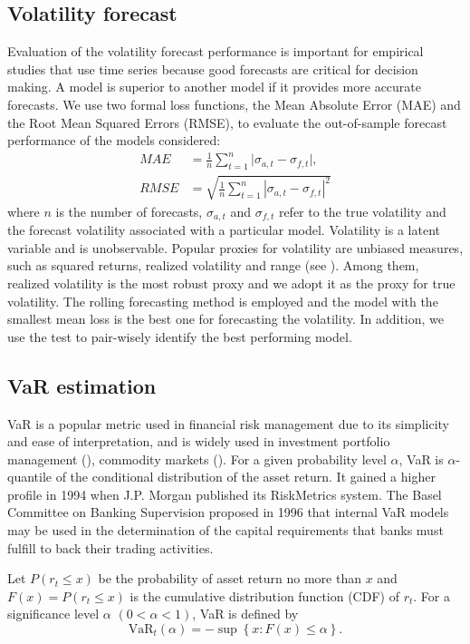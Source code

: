 \documentclass[preprint,12pt,authoryear]{elsarticle}
\begin{document}
\subsection{Volatility forecast}
Evaluation of the volatility forecast performance is important for empirical studies that use time series because good forecasts are critical for decision making. A model is superior to another model if it provides more accurate forecasts. We use two formal loss functions, the Mean Absolute Error (MAE) and the Root Mean Squared Errors (RMSE), to evaluate the out-of-sample forecast performance of the models considered:
\begin{align}
    MAE&=\frac{1}{n}\sum_{t=1}^n\vert\sigma_{a,t}-\sigma_{f,t}\vert,\\
    RMSE&=\sqrt{\frac{1}{n}\sum_{t=1}^n\left\vert\sigma_{a,t}-\sigma_{f,t}\right\vert^2}
\end{align}
where $n$ is the number of forecasts, $\sigma_{a,t}$ and $\sigma_{f,t}$ refer to the true volatility and the forecast volatility associated with a particular model. Volatility is a latent variable and is unobservable. Popular proxies for volatility are unbiased measures, such as squared returns, realized volatility and range (see \cite{Patton2011}). Among them, realized volatility is the most robust proxy and we adopt it as the proxy for true volatility.
The rolling forecasting method is employed and the model with the smallest mean loss is the best one for forecasting the volatility.
In addition, we use the \cite{Diebold1995} test to pair-wisely identify the best performing model.

\subsection{VaR estimation} \label{xiaodou1}
VaR is a popular metric used in financial risk management due to its simplicity and ease of interpretation, and is widely used in investment portfolio management (\cite{Chen2019}), commodity markets (\cite{Chkili2014}).
For a given probability level $\alpha$, VaR is $\alpha$-quantile of the conditional distribution of the asset return.
It gained a higher profile in 1994 when J.P. Morgan published its RiskMetrics system. The Basel Committee on Banking Supervision proposed in 1996 that internal VaR models may be used in the determination of the capital requirements that banks must fulfill to back their trading activities.

Let $P(r_{t}\le x)$ be the probability of asset return no more than $x$ and $F(x)=P(r_{t}\le x)$ is the cumulative distribution function (CDF) of $r_{t}$. For a significance level $\alpha$ $(0<\alpha<1)$, VaR is defined by
\begin{equation}
	\mathrm{VaR}_{t}(\alpha)=-\sup\left\{x: F(x)\le\alpha\right\}.
\end{equation}
\end{document}
